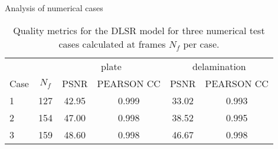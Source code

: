 \documentclass[10pt,aspectratio=169,dvipsnames]{beamer} %
\begin{document}
	\setcounter{subfigure}{0}
	\begin{frame}{Analysis of numerical cases}
		\begin{table}[!h]
			\centering \footnotesize
			\caption{Quality metrics for the DLSR model for three numerical test cases calculated at frames $N_f$ per case.}	
			\begin{tabular}{lccccc}
				\toprule[1.5pt]
				& & \multicolumn{2}{c}{plate} & \multicolumn{2}{c}{delamination} \\
				\cmidrule(lr){3-4} \cmidrule(lr){5-6}
				Case & $N_f$ & PSNR & PEARSON CC & PSNR & PEARSON CC \\ 
				\midrule
				1  & 127  & 42.95 & 0.999 & 33.02 & 0.993 \\					
				\midrule
				2  & 154 & 47.00 & 0.998 & 38.52 & 0.995 
				\\
				\midrule					
				3  & 159 & 48.60 & 0.998 & 46.67 & 0.998 \\					
				\bottomrule[1.5pt]
			\end{tabular}
			\label{tab:num_DLSR_results}
		\end{table}			
	\end{frame}
	\setcounter{subfigure}{0}
\end{document}
